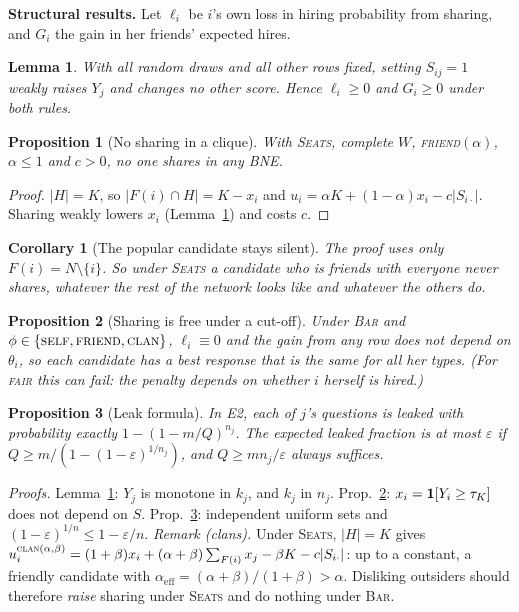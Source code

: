 \documentclass[10pt]{article}
\theoremstyle{plain}
\newtheorem{lemma}{Lemma}\newtheorem{proposition}{Proposition}\newtheorem{corollary}{Corollary}
\theoremstyle{definition}\newtheorem{definition}{Definition}
\newcommand{\seats}{\textsc{Seats}}\newcommand{\barr}{\textsc{Bar}}
\begin{document}
\textbf{Structural results.} Let $\ell_i$ be $i$'s own loss in hiring probability from sharing, and $G_i$ the gain in her friends' expected hires.
\begin{lemma}\label{lem:mono}With all random draws and all other rows fixed, setting $S_{ij}=1$ weakly raises $Y_j$ and changes no other score.
Hence $\ell_i\ge0$ and $G_i\ge0$ under both rules.\end{lemma}
\begin{proposition}[No sharing in a clique]\label{prop:clique}With \seats, complete $W$, \textsc{friend}$(\alpha)$, $\alpha\le1$ and $c>0$, no one shares in any BNE.\end{proposition}
\begin{proof}$|H|=K$, so $|F(i)\cap H|=K-x_i$ and $u_i=\alpha K+(1-\alpha)x_i-c|S_{i\cdot}|$. Sharing weakly lowers $x_i$ (Lemma~\ref{lem:mono}) and costs $c$.\end{proof}
\begin{corollary}[The popular candidate stays silent]\label{cor:hub}The proof uses only $F(i)=N\setminus\{i\}$. So under \seats{} a candidate who is friends with
\emph{everyone} never shares, whatever the rest of the network looks like and whatever the others do.\end{corollary}
\begin{proposition}[Sharing is free under a cut-off]\label{prop:bar}Under \barr{} and $\phi\in\{\textsc{self},\textsc{friend},\textsc{clan}\}$, $\ell_i\equiv0$ and the gain from any
row does not depend on $\theta_i$, so each candidate has a best response that is the same for all her types. (For \textsc{fair} this can fail: the
penalty depends on whether $i$ herself is hired.)\end{proposition}
\begin{proposition}[Leak formula]\label{prop:leak}In E2, each of $j$'s questions is leaked with probability exactly $1-(1-m/Q)^{n_j}$. The expected leaked
fraction is at most $\varepsilon$ if $Q\ge m/(1-(1-\varepsilon)^{1/n_j})$, and $Q\ge mn_j/\varepsilon$ always suffices.\end{proposition}
\emph{Proofs.} Lemma~\ref{lem:mono}: $Y_j$ is monotone in $k_j$, and $k_j$ in $n_j$. Prop.~\ref{prop:bar}: $x_i=\mathbf{1}[Y_i\ge\tau_K]$ does not depend on $S$.
Prop.~\ref{prop:leak}: independent uniform sets and $(1-\varepsilon)^{1/n}\le1-\varepsilon/n$.
\emph{Remark (clans).} Under \seats, $|H|=K$ gives
$u_i^{\textsc{clan}(\alpha,\beta)}=(1+\beta)x_i+(\alpha+\beta)\sum_{F(i)}x_j-\beta K-c|S_{i\cdot}|$: up to a constant, a friendly candidate with
$\alpha_{\text{eff}}=(\alpha+\beta)/(1+\beta)>\alpha$. Disliking outsiders should therefore \emph{raise} sharing under \seats{} and do nothing under \barr.
\end{document}
